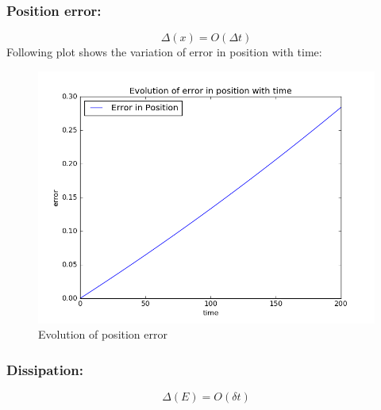\documentclass[11pt, a4paper]{article}
\begin{document}
\subsubsection{Position error:}
\begin{equation}
 \Delta (x) = O(\Delta t)
\end{equation}
Following plot shows the variation of error in position with time:
\begin{figure}[H]
 \centering
 \includegraphics[scale = 0.5]{Eu_err_pos_1.png}
 \caption{Evolution of position error}
\end{figure}


\subsubsection{Dissipation:}
\begin{equation}
 \Delta (E) = O (\delta t)
\end{equation}
\end{document}
